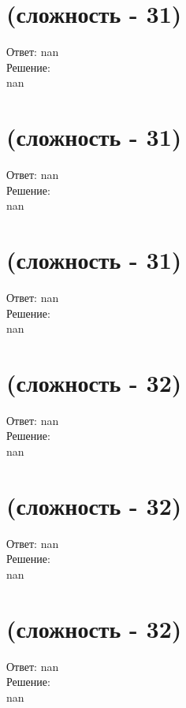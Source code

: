 \documentclass[a4paper,11pt]{article}%
\begin{document}
%
\section{(сложность {-} 31)}%
\label{sec:( {-} 31)}%
\hspace{3ex} Ответ: nan \\%
%
\hspace*{3ex} Решение: \\%
nan

%
\section{(сложность {-} 31)}%
\label{sec:( {-} 31)}%
\hspace{3ex} Ответ: nan \\%
%
\hspace*{3ex} Решение: \\%
nan

%
\section{(сложность {-} 31)}%
\label{sec:( {-} 31)}%
\hspace{3ex} Ответ: nan \\%
%
\hspace*{3ex} Решение: \\%
nan

%
\section{(сложность {-} 32)}%
\label{sec:( {-} 32)}%
\hspace{3ex} Ответ: nan \\%
%
\hspace*{3ex} Решение: \\%
nan

%
\section{(сложность {-} 32)}%
\label{sec:( {-} 32)}%
\hspace{3ex} Ответ: nan \\%
%
\hspace*{3ex} Решение: \\%
nan

%
\section{(сложность {-} 32)}%
\label{sec:( {-} 32)}%
\hspace{3ex} Ответ: nan \\%
%
\hspace*{3ex} Решение: \\%
nan
\end{document}
